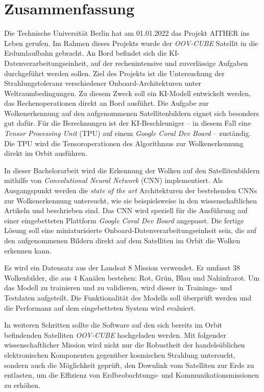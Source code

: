{

\setlength{\parindent}{0pt}
\setlength{\parskip}{1em}

\chapter*{Zusammenfassung}

Die Technische Universität Berlin hat am 01.01.2022 das Projekt AITHER ins Leben gerufen. Im Rahmen dieses Projekts wurde der \textit{OOV-CUBE} Satellit in die Erdumlaufbahn gebracht. An Bord befindet sich die KI-Daten\-ver\-ar\-bei\-tungs\-ein\-heit, auf der rechenintensive und zuverlässige Aufgaben durchgeführt werden sollen. Ziel des Projekts ist die Untersuchung der Strahlungstoleranz verschiedener Onboard-Architekturen unter Welt\-raum\-be\-ding\-un\-gen. Zu diesem Zweck soll ein KI-Modell entwickelt werden, das Rechenoperationen direkt an Bord ausführt. Die Aufgabe zur Wolkenerkennung auf den aufgenommenen Satellitenbildern eignet sich besonders gut dafür. Für die Berechnungen ist der KI-Beschleuniger -- in diesem Fall eine \textit{Tensor Processing Unit} (TPU) auf einem \textit{Google Coral Dev Board} -- zuständig. Die TPU wird die Tensoroperationen des Algorithmus zur Wolkenerkennung direkt im Orbit ausführen.

In dieser Bachelorarbeit wird die Erkennung der Wolken auf den Satellitenbildern mithilfe von \textit{Convolutional Neural Network} (CNN) implementiert. Als Ausgangspunkt werden die \textit{state of the art} Architekturen der bestehenden CNNs zur Wolkenerkennung untersucht, wie sie beispielsweise in den wissenschaftlichen Artikeln \cite{CloudNet2019} und \cite{CloudDet2018} beschrieben sind. Das CNN wird speziell für die Ausführung auf einer eingebetteten Plattform \textit{Google Coral Dev Board} angepasst. Die fertige Lösung soll eine miniaturisierte Onboard-Da\-ten\-ver\-ar\-bei\-tungs\-ein\-heit sein, die auf den aufgenommenen Bildern direkt auf dem Satelliten im Orbit die Wolken erkennen kann.

Es wird ein Datensatz aus der Landsat 8 Mission verwendet. Er umfasst 38 Wolkenbilder, die aus 4 Kanälen bestehen: Rot, Grün, Blau und Nahinfrarot. Um das Modell zu trainieren und zu validieren, wird dieser in Trainings- und Testdaten aufgeteilt. Die Funktionalität des Modells soll überprüft werden und die Performanz auf dem eingebetteten System wird evaluiert. 

In weiteren Schritten sollte die Software auf den sich bereits im Orbit befindenden Satelliten \textit{OOV-CUBE} hochgeladen werden. Mit folgender wissenschaftlicher Mission wird nicht nur die Robustheit der handelsüblichen elektronischen Komponenten gegenüber kosmischen Strahlung untersucht, sondern auch die Möglichkeit geprüft, den Downlink vom Satelliten zur Erde zu entlasten, um die Effizienz von Erdbeobachtungs- und Kommunikationsmissionen zu erhöhen.

}
